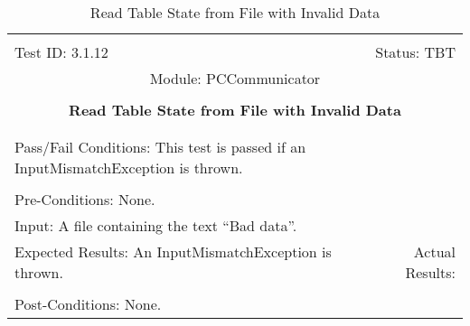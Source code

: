 \documentclass[titlepage]{article}
\begin{document}
\begin{center}%
\begin{table}
\begin{tabular}{|l r|}\hline&\\[-2mm]
	Test ID: 3.1.12	&Status: TBT\\[-3mm]
	\multicolumn{2}{|c|}{Module: PCCommunicator}\\&\\
	\multicolumn{2}{|c|}{\textbf{\large{Read Table State from File with Invalid Data}}}\\&\\\hline&\\[-3mm]
	\multicolumn{2}{|p{\textwidth}|}{Pass/Fail Conditions: This test is passed if an InputMismatchException is thrown.}\\[1mm]\hline&\\[-3mm]
	\multicolumn{2}{|p{\textwidth}|}{Pre-Conditions: None.}\\[4mm]
	\multicolumn{2}{|p{\textwidth}|}{Input: A file containing the text ``Bad data''.}\\[2mm]\hline
	\multicolumn{1}{|p{0.49\textwidth}}{Expected Results: An InputMismatchException is thrown.}	&\multicolumn{1}{|p{0.45\textwidth}|}{Actual Results: }\\\hline&\\[-3mm]
	\multicolumn{2}{|p{\textwidth}|}{Post-Conditions: None.}\\\hline
\end{tabular}
\caption{Read Table State from File with Invalid Data}
\end{table}
\end{center}
\end{document}
